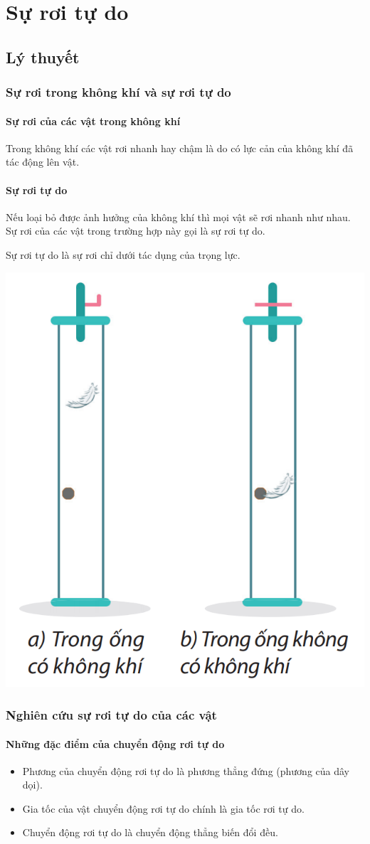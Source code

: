 \let\lesson\undefined
\newcommand{\lesson}{\phantomlesson{Bài 8: Sự rơi tự do}}
\chapter[Sự rơi tự do]{Sự rơi tự do}
\setcounter{section}{0}
\section{Lý thuyết}
\subsection{Sự rơi trong không khí và sự rơi tự do}
\subsubsection{Sự rơi của các vật trong không khí}
Trong không khí các vật rơi nhanh hay chậm là do có lực cản của không khí đã tác động lên vật.
\subsubsection{Sự rơi tự do }
Nếu loại bỏ được ảnh hưởng của không khí thì mọi vật sẽ rơi nhanh như nhau. Sự rơi của các vật trong trường hợp này gọi là sự rơi tự do.

Sự rơi tự do là sự rơi chỉ dưới tác dụng của trọng lực.
\begin{center}
	\includegraphics[width=0.25\linewidth]{../figs/VN10-2023-PH-TP011-1}
\end{center}
\subsection{Nghiên cứu sự rơi tự do của các vật}
\subsubsection{Những đặc điểm của chuyển động rơi tự do}
\begin{itemize}
	\item Phương của chuyển động rơi tự do là phương thẳng đứng (phương của dây dọi).
	\item Gia tốc của vật chuyển động rơi tự do chính là gia tốc rơi tự do.
	\item Chuyển động rơi tự do là chuyển động thẳng biến đổi đều.
\end{itemize}	


